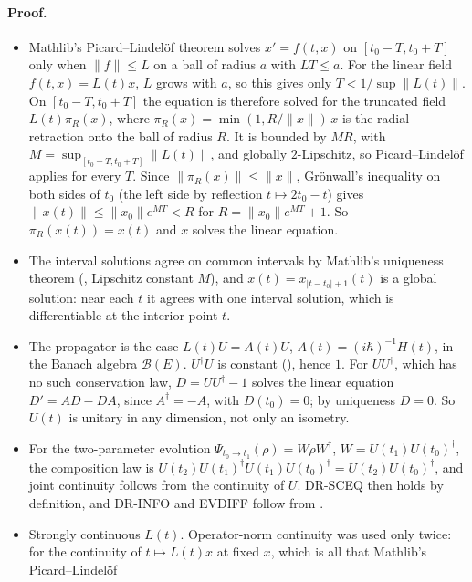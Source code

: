 \documentclass[11pt]{article}
\begin{document}
\paragraph{Proof.}
\begin{itemize}
\item Mathlib's Picard--Lindel\"of theorem solves $x' = f(t, x)$ on $[t_0 - T, t_0 + T]$ only
  when $\|f\| \le L$ on a ball of radius $a$ with $LT \le a$. For the linear field
  $f(t,x) = L(t)x$, $L$ grows with $a$, so this gives only $T < 1/\sup\|L(t)\|$. On
  $[t_0 - T, t_0 + T]$ the equation is therefore solved for the truncated field
  $L(t)\pi_R(x)$, where $\pi_R(x) = \min(1, R/\|x\|)\,x$ is the radial retraction onto the ball
  of radius $R$. It is bounded by $MR$, with $M = \sup_{[t_0-T,t_0+T]}\|L(t)\|$, and globally
  $2$-Lipschitz, so Picard--Lindel\"of applies for every $T$. Since $\|\pi_R(x)\| \le \|x\|$,
  Gr\"onwall's inequality on both sides of $t_0$ (the left side by reflection
  $t \mapsto 2t_0 - t$) gives $\|x(t)\| \le \|x_0\|e^{MT} < R$ for
  $R = \|x_0\|e^{MT} + 1$. So $\pi_R(x(t)) = x(t)$ and $x$ solves the linear equation.
\item The interval solutions agree on common intervals by Mathlib's uniqueness theorem
  (, Lipschitz constant $M$), and
  $x(t) = x_{|t - t_0| + 1}(t)$ is a global solution: near each $t$ it agrees with one interval
  solution, which is differentiable at the interior point $t$.
\item The propagator is the case $L(t)U = A(t)U$, $A(t) = (i\hbar)^{-1}H(t)$, in the Banach
  algebra $\mathcal{B}(E)$. $U^\dagger U$ is constant (),
  hence $1$. For $UU^\dagger$, which has no such conservation law, $D = UU^\dagger - 1$ solves
  the linear equation $D' = AD - DA$, since $A^\dagger = -A$, with $D(t_0) = 0$; by uniqueness
  $D = 0$. So $U(t)$ is unitary in any dimension, not only an isometry.
\item For the two-parameter evolution $\Psi_{t_0\to t_1}(\rho) = W\rho W^\dagger$,
  $W = U(t_1)U(t_0)^\dagger$, the composition law is $U(t_2)U(t_1)^\dagger U(t_1)U(t_0)^\dagger =
  U(t_2)U(t_0)^\dagger$, and joint continuity follows from the continuity of $U$. DR-SCEQ then
  holds by definition, and DR-INFO and EVDIFF follow from
  .
\item Strongly continuous $L(t)$. Operator-norm continuity was used only twice: for the
  continuity of $t \mapsto L(t)x$ at fixed $x$, which is all that Mathlib's Picard--Lindel\"of

\end{itemize}
\end{document}
